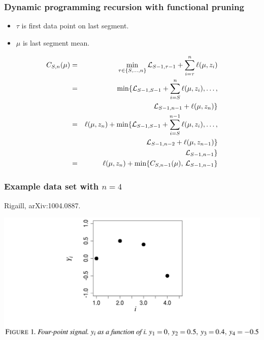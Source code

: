 \documentclass{beamer}
\begin{document}
\begin{frame}
  \frametitle{Dynamic programming recursion with functional pruning}
  \begin{itemize}
  \item $\tau$ is first data point on last segment.
  \item $\mu$ is last segment mean.
  \end{itemize}
  \begin{eqnarray*}
    C_{S,n}(\mu) &=&
    \min_{\tau\in\{S, \dots, n\} }
\mathcal L_{S-1, \tau-1}
 +
\sum_{i=\tau}^{n} \ell( \mu,  z_i)\\
&=&\min\{\mathcal L_{S-1,S-1} + \sum_{i=S}^{n} \ell( \mu,  z_i), \dots,\\
    &&\hskip 0.8cm \mathcal L_{S-1,n-1} + \ell( \mu,  z_n) \}\\
&=&\ell( \mu,  z_n) + \min\{\mathcal L_{S-1,S-1} + \sum_{i=S}^{n-1} \ell( \mu,  z_i), \dots,\\
    &&\hskip 2.7cm \mathcal L_{S-1,n-2}  +\ell( \mu,  z_{n-1})\}\\
    &&\hskip 2.7cm \mathcal L_{S-1,n-1}  \}\\
&=&\ell( \mu,  z_n)+
\min\{
    C_{S,n-1}(\mu),\,  
    \mathcal L_{S-1,n-1}
\}
  \end{eqnarray*}
\end{frame}


\begin{frame}
  \frametitle{Example data set with $n=4$}
  Rigaill, arXiv:1004.0887.

  \includegraphics[width=\textwidth]{screenshot-figure-1}
\end{frame}
\end{document}
